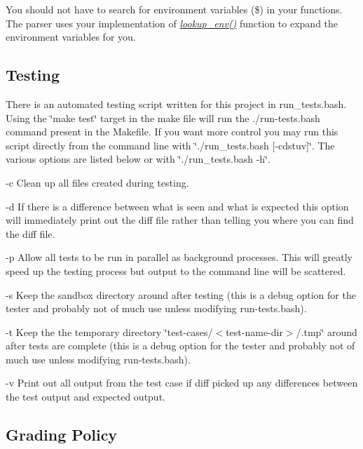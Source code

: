 You should not have to search for environment variables (\$) in your functions. The parser uses your implementation of {\itshape \hyperlink{execute_8c_afeab372587374ba444aa9bdfb6cfa0d8}{lookup\-\_\-env()}} function to expand the environment variables for you.

\subsection*{Testing}

There is an automated testing script written for this project in run\-\_\-tests.\-bash. Using the \char`\"{}make test\char`\"{} target in the make file will run the ./run-\/tests.bash command present in the Makefile. If you want more control you may run this script directly from the command line with \char`\"{}./run\-\_\-tests.\-bash \mbox{[}-\/cdstuv\mbox{]}\char`\"{}. The various options are listed below or with \char`\"{}./run\-\_\-tests.\-bash -\/h\char`\"{}.


\begin{DoxyItemize}
\item -\/c Clean up all files created during testing.
\item -\/d If there is a difference between what is seen and what is expected this option will immediately print out the diff file rather than telling you where you can find the diff file.
\item -\/p Allow all tests to be run in parallel as background processes. This will greatly speed up the testing process but output to the command line will be scattered.
\item -\/s Keep the sandbox directory around after testing (this is a debug option for the tester and probably not of much use unless modifying run-\/tests.\-bash).
\item -\/t Keep the the temporary directory \char`\"{}test-\/cases/$<$test-\/name-\/dir$>$/.\-tmp\char`\"{} around after tests are complete (this is a debug option for the tester and probably not of much use unless modifying run-\/tests.\-bash).
\item -\/v Print out all output from the test case if diff picked up any differences between the test output and expected output.
\end{DoxyItemize}

\subsection*{Grading Policy}

